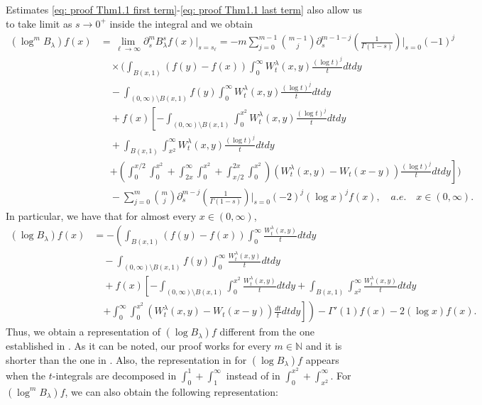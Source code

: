 \documentclass[a4paper,10pt, reqno]{amsart}
\theoremstyle{definition}
\theoremstyle{remark}
\numberwithin{equation}{section}
\begin{document}
Estimates \eqref{eq: proof Thm1.1 first term}-\eqref{eq: proof Thm1.1 last term} also allow us to take limit as $s\rightarrow 0^+$ inside the integral and we obtain
\begin{align*}
    (\log^m B_\lambda)f(x)&=\lim_{\ell\rightarrow \infty}\partial_s^m B_\lambda^sf(x)\Big|_{s=s_\ell}=-m\sum_{j=0}^{m-1}\binom{m-1}{j}\partial_s^{m-1-j}\left(\frac{1}{\Gamma (1-s)}\right)\Bigg|_{s=0}(-1)^j\\
    &\quad \times \Bigg(\int_{B(x,1)}(f(y)-f(x))\int_0^\infty W_t^\lambda (x,y)\frac{(\log t)^j}{t}dtdy\\
    &\quad -\int_{(0,\infty)\setminus B(x,1)}f(y)\int_0^\infty W_t^\lambda (x,y)\frac{(\log t)^j}{t}dtdy\\
    &\quad +f(x)\left[-\int_{(0,\infty)\setminus B(x,1)}\int_0^{x^2}W_t^\lambda (x,y)\frac{(\log t)^j}{t}dtdy\right.\\
    &\quad +\int_{B(x,1)}\int_{x^2}^\infty W_t^\lambda (x,y)\frac{(\log t)^j}{t}dtdy\\
    &\quad \left.+\left(\int_0^{x/2}\int_0^{x^2}+\int_{2x}^\infty \int_0^{x^2}+\int_{x/2}^{2x}\int_0^{x^2}\right)(W_t^\lambda (x,y)-W_t(x-y))\frac{(\log t)^j}{t}dtdy\right]\Bigg)\\
    &\quad -\sum_{j=0}^m\binom{m}{j}\partial_s^{m-j}\left(\frac{1}{\Gamma (1-s)}\right)\Bigg|_{s=0}(-2)^j(\log x)^jf(x),\quad a.e. \quad  x\in (0,\infty).
\end{align*}
In particular, we have that for almost every $x\in (0,\infty)$,
\begin{align*}
    (\log B_\lambda)f(x)&=-\left(\int_{B(x,1)}(f(y)-f(x))\int_0^\infty \frac{W_t^\lambda (x,y)}{t}dtdy\right.\\
    &\quad -\int_{(0,\infty)\setminus B(x,1)}f(y)\int_0^\infty \frac{W_t^\lambda (x,y)}{t}dtdy\\
    &\quad +f(x)\left[-\int_{(0,\infty)\setminus B(x,1)}\int_0^{x^2}\frac{W_t^\lambda (x,y)}{t}dtdy+\int_{B(x,1)}\int_{x^2}^\infty \frac{W_t^\lambda (x,y)}{t}dtdy\right.\\
    &\quad \left.\left.+\int_0^\infty\int_0^{x^2}(W_t^\lambda (x,y)-W_t(x-y))\frac{dt}{t}dtdy\right]\right)-\Gamma '(1)f(x)-2(\log x )f(x).
\end{align*}
Thus, we obtain a representation of $(\log B_\lambda)f$ different from the one established in \cite[Theorem 2.4]{FLZ}. As it can be noted, our proof works for every $m\in \mathbb N$ and it is shorter than the one in \cite[Theorem 2.4]{FLZ}. Also, the representation in \cite[Theorem 2.4]{FLZ} for $(\log B_\lambda)f$ appears when the $t$-integrals are decomposed in $\int_0^1+\int_1^\infty$ instead of in $\int_0^{x^2}+\int_{x^2}^\infty$. For $(\log^m B_\lambda)f$, we can also obtain the following representation:
\end{document}
